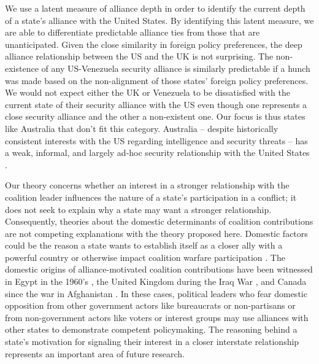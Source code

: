 \documentclass[12pt,letterpaper]{article}
\begin{document}
		We use a latent measure of alliance depth in order to identify the current depth of a state's alliance with the United States. By identifying this latent measure, we are able
		to differentiate predictable alliance ties from those that are unanticipated. Given the close similarity in foreign policy preferences, the deep alliance relationship between the US and the UK is not surprising. The non-existence of any US-Venezuela security alliance is similarly predictable if a hunch was made based on the non-alignment of those states' foreign policy preferences. We would not expect either the UK or Venezuela to be dissatisfied with the current state of their security alliance with the US even though one represents a close security alliance and the other a non-existent one. Our focus is thus states like Australia that don't fit this category. Australia -- despite historically consistent interests with the US regarding intelligence and security threats -- has a weak, informal, and largely ad-hoc security relationship with the United States \citep{fruhling_anzusreallyalliance_2018}.
		
		Our theory concerns whether an interest in a stronger relationship with the coalition leader influences the nature of a state's participation in a conflict; it does not seek to explain why a state may want a stronger relationship. Consequently, theories about the domestic determinants of coalition contributions are not competing explanations with the theory proposed here. Domestic factors could be the reason a state wants to establish itself as a closer ally with a powerful country \citep{tago_whenaredemocratic_2009, pilster_aredemocraciesbetter_2011, wolford_nationalleaderspolitical_2016} or otherwise impact coalition warfare participation \citep{baum_iraqcoalitionwilling_2013}. The domestic origins of alliance-motivated coalition contributions have been witnessed in Egypt in the 1960's \citep{barnett_domesticsourcesalliances_1991}, the United Kingdom during the Iraq War \citep{davidson_americaallieswar_2011}, and Canada since the war in Afghanistan \citep{massie_alliancevaluestatus_2018, mckay_whycanadabest_2018}. In these cases, political leaders who fear domestic opposition from other government actors like bureaucrats or non-partisans or from non-government actors like voters or interest groups may use alliances with other states to demonstrate competent policymaking. The reasoning behind a state's motivation for signaling their interest in a closer interstate relationship represents an important area of future research.
		
\end{document}
